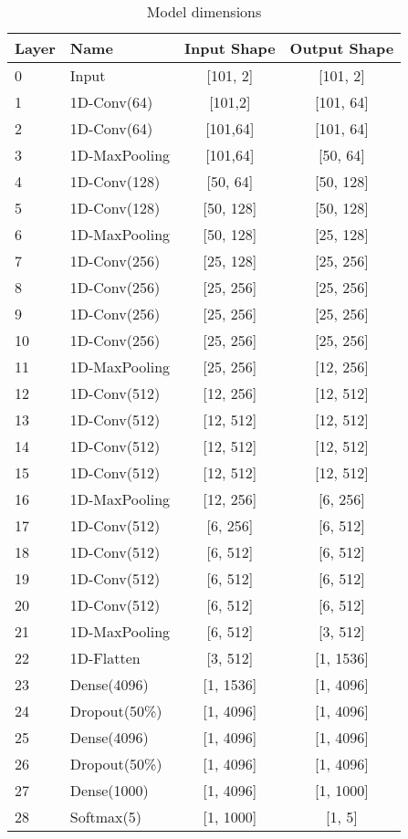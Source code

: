 		\begin{table}
	    \centering
	    \begin{tabular}{|l|l|c|c|}
				\hline
		    Layer & Name & Input Shape & Output Shape  \\
				\hline
		    0 & Input & [101, 2] & [101, 2]\\
				1 & 1D-Conv(64) & [101,2] & [101, 64] \\
				2 & 1D-Conv(64) & [101,64] & [101, 64] \\
				3 & 1D-MaxPooling & [101,64] & [50, 64] \\
				\hline
				4 & 1D-Conv(128) & [50, 64] & [50, 128] \\
				5 & 1D-Conv(128) & [50, 128] & [50, 128]\\
				6 & 1D-MaxPooling & [50, 128] & [25, 128] \\
				\hline
				7 & 1D-Conv(256) & [25, 128] & [25, 256]\\
				8 & 1D-Conv(256) & [25, 256] & [25, 256]\\
				9 & 1D-Conv(256) & [25, 256] & [25, 256]\\
				10 & 1D-Conv(256) & [25, 256] & [25, 256]\\
				11 & 1D-MaxPooling & [25, 256] & [12, 256] \\
				\hline
				12 & 1D-Conv(512) & [12, 256] & [12, 512] \\
				13 & 1D-Conv(512) & [12, 512] & [12, 512] \\
				14 & 1D-Conv(512) & [12, 512] & [12, 512] \\
				15 & 1D-Conv(512) & [12, 512] & [12, 512] \\
				16 & 1D-MaxPooling & [12, 256] & [6, 256] \\
				\hline
				17 & 1D-Conv(512) & [6, 256] & [6, 512] \\
				18 & 1D-Conv(512) & [6, 512] & [6, 512] \\
				19 & 1D-Conv(512) & [6, 512] & [6, 512] \\
				20 & 1D-Conv(512) & [6, 512] & [6, 512] \\
				21 & 1D-MaxPooling & [6, 512] & [3, 512] \\
				\hline
				22 & 1D-Flatten & [3, 512] & [1, 1536] \\
				23 & Dense(4096) & [1, 1536] & [1, 4096] \\
				24 & Dropout(50\%) & [1, 4096] & [1, 4096] \\
				25 & Dense(4096) & [1, 4096] & [1, 4096] \\
				26 & Dropout(50\%) & [1, 4096] & [1, 4096] \\
				27 & Dense(1000) & [1, 4096] & [1, 1000] \\
				28 & Softmax(5) & [1, 1000] & [1, 5] \\
				\hline
			\end{tabular}
	    \caption[VGG topology]{Model dimensions}
	    \label{tab:vgg-19}
	  \end{table}


